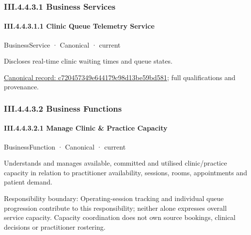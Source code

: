 \subsubsection*{III.4.4.3.1 Business Services}
\label{navigation:III.4.4.3.1}

\paragraph*{III.4.4.3.1.1 Clinic Queue Telemetry Service}
\label{navigation:III.4.4.3.1.1}

\label{element:c720457349e644179c98d13be59bd581}
{\small BusinessService · Canonical · current}\par

Discloses real-time clinic waiting times and queue states.


{\footnotesize \href{../../../../../../../continuum/business/business-service/c720457349e644179c98d13be59bd581.md}{Canonical record: c720457349e644179c98d13be59bd581}; full qualifications and provenance.}\par
\subsubsection*{III.4.4.3.2 Business Functions}
\label{navigation:III.4.4.3.2}

\paragraph*{III.4.4.3.2.1 Manage Clinic \& Practice Capacity}
\label{navigation:III.4.4.3.2.1}

\label{element:389fb97b2bcd4527959a61f2a288bc39}
{\small BusinessFunction · Canonical · current}\par

Understands and manages available, committed and utilised clinic/practice capacity in relation to practitioner availability, sessions, rooms, appointments and patient demand.



Responsibility boundary: Operating-session tracking and individual queue progression contribute to this responsibility; neither alone expresses overall service capacity. Capacity coordination does not own source bookings, clinical decisions or practitioner rostering.


